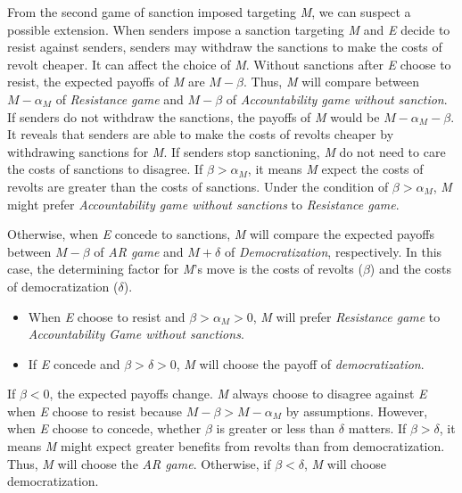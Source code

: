 \documentclass[11pt]{article}
\begin{document}
From the second game of sanction imposed targeting \textit{M}, we can suspect a possible extension. When senders impose a sanction targeting \textit{M} and \textit{E} decide to resist against senders, senders may withdraw the sanctions to make the costs of revolt cheaper. It can affect the choice of \textit{M}. Without sanctions after \textit{E} choose to resist, the expected payoffs of \textit{M} are $M-\beta$. Thus, \textit{M} will compare between $M-\alpha_{M}$ of \textit{Resistance game} and $M-\beta$ of \textit{Accountability game without sanction}. If senders do not withdraw the sanctions, the payoffs of \textit{M} would be $M-\alpha_{M}-\beta$. It reveals that senders are able to make the costs of revolts cheaper by withdrawing sanctions for \textit{M}. If senders stop sanctioning, \textit{M} do not need to care the costs of sanctions to disagree. If $\beta > \alpha_{M}$, it means \textit{M} expect the costs of revolts are greater than the costs of sanctions. Under the condition of $\beta  > \alpha_{M}$, \textit{M} might prefer \textit{Accountability game without sanctions} to \textit{Resistance game}.

Otherwise, when \textit{E} concede to sanctions, \textit{M} will compare the expected payoffs between $M-\beta$ of \textit{AR game} and $M + \delta$ of \textit{Democratization}, respectively. In this case, the determining factor for \textit{M}'s move is the costs of revolts ($\beta$) and the costs of democratization ($\delta$).

\begin{itemize}
	\item When \textit{E} choose to resist and $\beta > \alpha_{M} > 0$, \textit{M} will prefer \textit{Resistance game} to \textit{Accountability Game without sanctions}.
	\item If \textit{E} concede and $\beta > \delta > 0$, \textit{M} will choose the payoff of \textit{democratization}.
\end{itemize}

If $\beta < 0$, the expected payoffs change. \textit{M} always choose to disagree against \textit{E} when \textit{E} choose to resist because $M-\beta > M-\alpha_{M}$ by assumptions. However, when \textit{E} choose to concede, whether $\beta$ is greater or less than $\delta$ matters. If $\beta > \delta$, it means \textit{M} might expect greater benefits from revolts than from democratization. Thus, \textit{M} will choose the \textit{AR game}. Otherwise, if $\beta < \delta$, \textit{M} will choose democratization.
\end{document}
